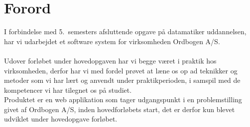 \section{Forord}
I forbindelse med 5.\ semesters afsluttende opgave på datamatiker uddannelsen, har vi udarbejdet et software system for virksomheden Ordbogen A/S.
\\\\
Udover forløbet under hovedopgaven har vi begge været i praktik hos virksomheden, derfor har vi med fordel prøvet at læne os op ad teknikker og metoder
som vi har lært og anvendt under praktikperioden, i samspil med de kompetencer vi har tilegnet os på studiet.
\\
Produktet er en web applikation som tager udgangspunkt i en problemstilling givet af Ordbogen A/S, inden hovedforløbets start, det er derfor kun blevet udviklet under
hovedopgave forløbet.
